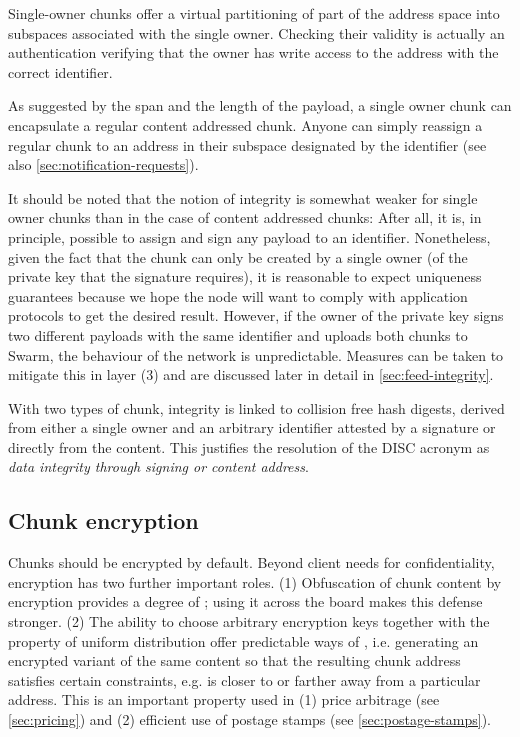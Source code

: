 Single-owner chunks offer a virtual partitioning of part of the address space into subspaces associated with the single owner. Checking their validity is actually an authentication verifying that the owner has write access to the address with the correct identifier.

As suggested by the span and the length of the payload, a single owner chunk can encapsulate a regular content addressed chunk. Anyone can simply reassign a regular chunk to an address in their subspace designated by the identifier (see also \ref{sec:notification-requests}).


It should be noted that the notion of integrity is somewhat weaker for single owner chunks than in the case of content addressed chunks: After all, it is, in principle, possible to assign and sign any payload to an identifier. Nonetheless, given the fact that the chunk can only be created by a single owner (of the private key that the signature requires), it is reasonable to expect uniqueness guarantees because we hope the node will want to comply with application protocols to get the desired result. However, if the owner of the private key signs two different payloads with the same identifier and uploads both chunks to Swarm, the behaviour of the network is unpredictable. Measures can be taken to mitigate this in layer (3) and are discussed later in detail in \ref{sec:feed-integrity}.

With two types of chunk, integrity is linked to collision free hash digests, derived from either a single owner and an arbitrary identifier attested by a signature or directly from the content. This justifies the resolution of the DISC acronym as \emph{data integrity through signing or content address}.

\subsection{Chunk encryption\statusgreen}\label{sec:chunk-encryption}

Chunks should be encrypted by default. Beyond client needs for confidentiality, encryption has two further important roles. (1) Obfuscation of chunk content by encryption provides a degree of ; using it across the board makes this defense stronger. (2) The ability to choose arbitrary encryption keys together with the property of uniform distribution offer predictable ways of , i.e. generating an encrypted variant of the same content so that the resulting chunk address satisfies certain constraints, e.g. is closer to or farther away from a particular address. This is an important property used in (1) price arbitrage (see \ref{sec:pricing}) and (2) efficient use of postage stamps (see \ref{sec:postage-stamps}).


